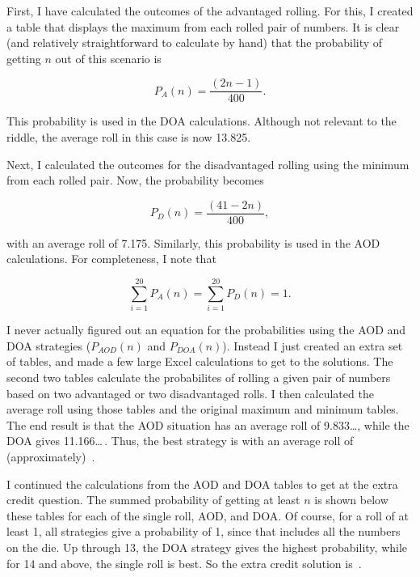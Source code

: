 \documentclass{article}
\begin{document}
First, I have calculated the outcomes of the advantaged rolling.
For this, I created a table that displays the maximum from each rolled pair of numbers.
It is clear (and relatively straightforward to calculate by hand) that the probability of getting $n$ out of this scenario is

\begin{equation*}
P_{A}(n)=\frac{(2n-1)}{400}.
\end{equation*}

This probability is used in the DOA calculations.
Although not relevant to the riddle, the average roll in this case is now 13.825.

Next, I calculated the outcomes for the disadvantaged rolling using the minimum from each rolled pair.
Now, the probability becomes

\begin{equation*}
P_{D}(n)=\frac{(41-2n)}{400},
\end{equation*}

with an average roll of 7.175.
Similarly, this probability is used in the AOD calculations.
For completeness, I note that

\begin{equation*}
\sum_{i=1}^{20}P_{A}(n)=\sum_{i=1}^{20}P_{D}(n)=1.
\end{equation*}

I never actually figured out an equation for the probabilities using the AOD and DOA strategies ($P_{AOD}(n)$ and $P_{DOA}(n)$).
Instead I just created an extra set of tables, and made a few large Excel calculations to get to the solutions.
The second two tables calculate the probabilites of rolling a given pair of numbers based on two advantaged or two disadvantaged rolls.
I then calculated the average roll using those tables and the original maximum and minimum tables.
The end result is that the AOD situation has an average roll of 9.833\dots, while the DOA gives 11.166\dots\,.
Thus, the best strategy is
with an average roll of (approximately)
\,.

I continued the calculations from the AOD and DOA tables to get at the extra credit question.
The summed probability of getting at least $n$ is shown below these tables for each of the single roll, AOD, and DOA.
Of course, for a roll of at least 1, all strategies give a probability of 1, since that includes all the numbers on the die.
Up through 13, the DOA strategy gives the highest probability, while for 14 and above, the single roll is best.
So the extra credit solution is
\,.
\end{document}
